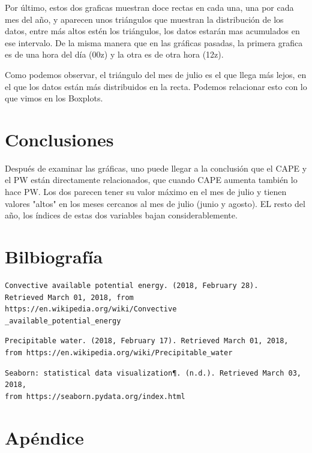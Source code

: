 \documentclass{article}
\begin{document}
Por último, estos dos graficas muestran doce rectas en cada una, una por cada mes del año, y aparecen unos triángulos que muestran la distribución de los datos, entre más altos estén los triángulos, los datos estarán mas acumulados en ese intervalo.
De la misma manera que en las gráficas pasadas, la primera grafica es de una hora del día (00z) y la otra es de otra hora (12z).  

Como podemos observar, el triángulo del mes de julio es el que llega más lejos, en el que los datos están más distribuidos en la recta. Podemos relacionar esto con lo que vimos en los Boxplots.

\section{Conclusiones}

Después de examinar las gráficas, uno puede llegar a la conclusión que el CAPE y el PW están directamente relacionados, que cuando CAPE aumenta también lo hace PW. Los dos parecen tener su valor máximo en el mes de julio y tienen valores "altos" en los meses cercanos al mes de julio (junio y agosto). EL resto del año, los índices de estas dos variables bajan considerablemente.

\section{Bilbiografía}

\begin{verbatim}
Convective available potential energy. (2018, February 28). 
Retrieved March 01, 2018, from https://en.wikipedia.org/wiki/Convective
_available_potential_energy
\end{verbatim}

\begin{verbatim}
Precipitable water. (2018, February 17). Retrieved March 01, 2018, 
from https://en.wikipedia.org/wiki/Precipitable_water 
\end{verbatim}

\begin{verbatim}
Seaborn: statistical data visualization¶. (n.d.). Retrieved March 03, 2018,
from https://seaborn.pydata.org/index.html
\end{verbatim}

\section{Apéndice}
\end{document}
